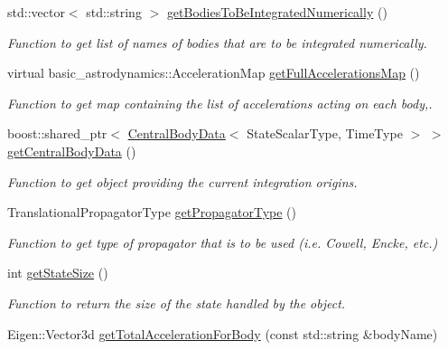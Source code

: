 \begin{DoxyCompactItemize}
std\+::vector$<$ std\+::string $>$ \hyperlink{classtudat_1_1propagators_1_1NBodyStateDerivative_a6371faac2a8c345ff0b585708e5df1f8}{get\+Bodies\+To\+Be\+Integrated\+Numerically} ()
\begin{DoxyCompactList}\small\item\em Function to get list of names of bodies that are to be integrated numerically. \end{DoxyCompactList}\item 
virtual basic\+\_\+astrodynamics\+::\+Acceleration\+Map \hyperlink{classtudat_1_1propagators_1_1NBodyStateDerivative_ace7b03eeaa9a2571af87d578d3b747c7}{get\+Full\+Accelerations\+Map} ()
\begin{DoxyCompactList}\small\item\em Function to get map containing the list of accelerations acting on each body,. \end{DoxyCompactList}\item 
boost\+::shared\+\_\+ptr$<$ \hyperlink{classtudat_1_1propagators_1_1CentralBodyData}{Central\+Body\+Data}$<$ State\+Scalar\+Type, Time\+Type $>$ $>$ \hyperlink{classtudat_1_1propagators_1_1NBodyStateDerivative_a3f9dbc0f8bff359e387bdc8a488e1495}{get\+Central\+Body\+Data} ()
\begin{DoxyCompactList}\small\item\em Function to get object providing the current integration origins. \end{DoxyCompactList}\item 
Translational\+Propagator\+Type \hyperlink{classtudat_1_1propagators_1_1NBodyStateDerivative_a6854e29873694a2ec2f25950b5315796}{get\+Propagator\+Type} ()
\begin{DoxyCompactList}\small\item\em Function to get type of propagator that is to be used (i.\+e. Cowell, Encke, etc.) \end{DoxyCompactList}\item 
int \hyperlink{classtudat_1_1propagators_1_1NBodyStateDerivative_a93aeb6b8f4de1817816ad19ddec65a19}{get\+State\+Size} ()
\begin{DoxyCompactList}\small\item\em Function to return the size of the state handled by the object. \end{DoxyCompactList}\item 
Eigen\+::\+Vector3d \hyperlink{classtudat_1_1propagators_1_1NBodyStateDerivative_a2f6fa526b5bfa1e80a7c4a80fa36ea91}{get\+Total\+Acceleration\+For\+Body} (const std\+::string \&body\+Name)

\end{DoxyCompactItemize}
